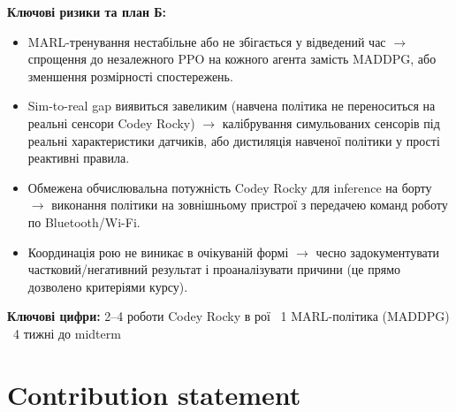 \documentclass[ukrainian]{ucuproposal}
\begin{document}
\textbf{Ключові ризики та план Б:}
\begin{itemize}
  \item MARL-тренування нестабільне або не збігається у відведений час $\rightarrow$ спрощення до незалежного PPO на кожного агента замість MADDPG, або зменшення розмірності спостережень.
  \item Sim-to-real gap виявиться завеликим (навчена політика не переноситься на реальні сенсори Codey Rocky) $\rightarrow$ калібрування симульованих сенсорів під реальні характеристики датчиків, або дистиляція навченої політики у прості реактивні правила.
  \item Обмежена обчислювальна потужність Codey Rocky для inference на борту $\rightarrow$ виконання політики на зовнішньому пристрої з передачею команд роботу по Bluetooth/Wi-Fi.
  \item Координація рою не виникає в очікуваній формі $\rightarrow$ чесно задокументувати частковий/негативний результат і проаналізувати причини (це прямо дозволено критеріями курсу).
\end{itemize}

\begin{keyfacts}
\textbf{Ключові цифри:} 2--4 роботи Codey Rocky в рої \textperiodcentered\ 1 MARL-політика (MADDPG) \textperiodcentered\ 4 тижні до midterm
\end{keyfacts}

\section{Contribution statement}
\begin{contributions}
\end{contributions}


\ucuprintbibliography
\end{document}
